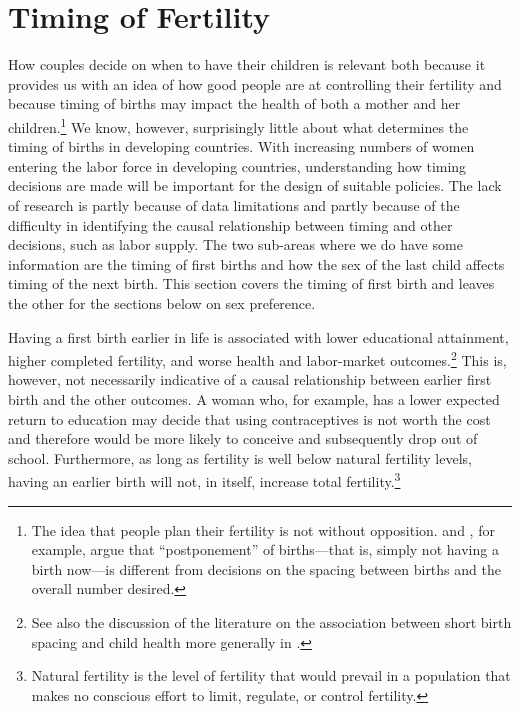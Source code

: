 \section{Timing of Fertility}\label{timing-of-fertility}

How couples decide on when to have their children is relevant both because it provides us with an idea of how good people are at controlling their fertility and because timing of births may impact the health of both a mother and her children.\footnote{The idea that people plan their fertility is not without opposition. \citet{Timaeus2008} and \citet{Moultrie2012}, for example, argue that ``postponement'' of births---that is, simply not having a birth now---is different from decisions on the spacing between births and the overall number desired.} We know, however, surprisingly little about what determines the timing of births in developing countries. With increasing numbers of women entering the labor force in developing countries, understanding how timing decisions are made will be important for the design of suitable policies. The lack of research is partly because of data limitations and partly because of the difficulty in identifying the causal relationship between timing and other decisions, such as labor supply. The two sub-areas where we do have some information are the timing of first births and how the sex of the last child affects timing of the next birth. This section covers the timing of first birth and leaves the other for the sections below on sex preference.

Having a first birth earlier in life is associated with lower educational attainment, higher completed fertility, and worse health and labor-market outcomes.\footnote{See also the discussion of the literature on the association between short birth spacing and child health more generally in \citet{Casterline2016}.} This is, however, not necessarily indicative of a causal relationship between earlier first birth and the other outcomes. A woman who, for example, has a lower expected return to education may decide that using contraceptives is not worth the cost and therefore would be more likely to conceive and subsequently drop out of school. Furthermore, as long as fertility is well below natural fertility levels, having an earlier birth will not, in itself, increase total fertility.\footnote{Natural fertility is the level of fertility that would prevail in a population that makes no conscious effort to limit, regulate, or control fertility.}


